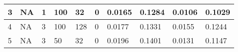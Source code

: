 \begin{table}
{\begin{tabular}{|llllllllll|}
3             & NA                                                              & 1                                                               & 100            & 32                                                             & 0                & 0.0165                                                                    & 0.1284                                                                   & 0.0106                                                               & 0.1029                                                              \\ \hline
4             & NA                                                              & 3                                                               & 100            & 128                                                            & 0                & 0.0177                                                                    & 0.1331                                                                   & 0.0155                                                               & 0.1244                                                              \\ \hline
5             & NA                                                              & 3                                                               & 50             & 32                                                             & 0                & 0.0196                                                                    & 0.1401                                                                   & 0.0131                                                               & 0.1147                                                              \\ \hline
\end{tabular}}
\end{table}

